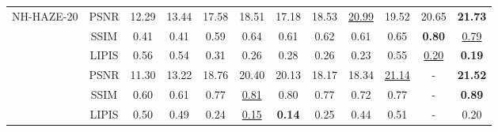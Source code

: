 \documentclass[journal]{IEEEtran}
\begin{document}
\begin{table}
\begin{center}
{\begin{tabular}{ c | c | c | c | c | c | c | c | c | c | c | c }
				\multirow{4}{*}{NH-HAZE-20} & PSNR                    & 12.29                  & 13.44               & 17.58                   & 18.51                & 17.18               & 18.53                      & \underline{20.99}                 & 19.52                   & 20.65                            & \textbf{21.73}        \\
				                            & SSIM                    & 0.41                   & 0.41                & 0.59                    & 0.64                 & 0.61                & 0.62                       & 0.61                              & 0.65                    & \textbf{0.80}                    & \underline{0.79}      \\
				                            & LIPIS                   & 0.56                   & 0.54                & 0.31                    & 0.26                 & 0.28                & 0.26                       & 0.23                              & 0.55                    & \underline{0.20}                 & \textbf{0.19}         \\
				\hline

				\multirow{4}{*}{NH-HAZE-21} & PSNR                    & 11.30                  & 13.22               & 18.76                   & 20.40                & 20.13               & 18.17                      & 18.34                             & \underline{21.14}       & -                                & \textbf{21.52}        \\
				                            & SSIM                    & 0.60                   & 0.61                & 0.77                    & \underline{0.81}     & 0.80                & 0.77                       & 0.72                              & 0.77                    & -                                & \textbf{0.89}         \\
				                            & LIPIS                   & 0.50                   & 0.49                & 0.24                    & \underline{0.15}     & \textbf{0.14}       & 0.25                       & 0.44                              & 0.51                    & -                                & 0.20                  \\
				\hline


\end{tabular}}
\end{center}
\end{table}
\end{document}
